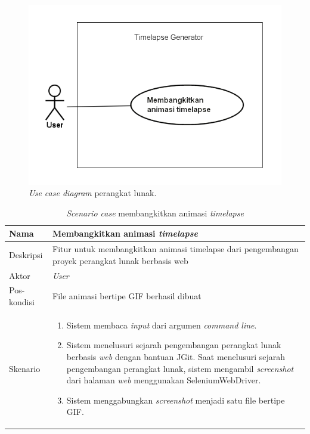 \begin{figure}[H]
	\centering
		\includegraphics[scale=0.8]{Gambar/UseCaseDiagram1.png}
	\caption{\textit{Use case diagram} perangkat lunak.}
	\label{fig:uc}
\end{figure}

\begin{table}[H]
    \centering
    \begin{tabular}{|p{3cm}|p{10cm}|}
    \hline
        Nama & Membangkitkan animasi \textit{timelapse}\\
    \hline
    \hline
        Deskripsi & Fitur untuk membangkitkan animasi timelapse dari pengembangan proyek perangkat lunak berbasis web\\
    \hline
        Aktor & \textit{User} \\
    \hline
        Pos-kondisi &  File animasi bertipe GIF berhasil dibuat\\
    \hline
        Skenario & 
        \begin{enumerate}
        \item Sistem membaca \textit{input} dari argumen \textit{command line}.
            \item Sistem menelusuri sejarah pengembangan perangkat lunak berbasis \textit{web} dengan bantuan
JGit. Saat menelusuri sejarah pengembangan perangkat lunak, sistem mengambil \textit{screenshot} dari halaman \textit{web} menggunakan SeleniumWebDriver.
            \item Sistem menggabungkan \textit{screenshot} menjadi satu file bertipe GIF.
        \end{enumerate}\\
    \hline
    \end{tabular}
    \caption{\textit{Scenario case} membangkitkan animasi \textit{timelapse}}
    \label{tab:tabel_sc_animasi}
\end{table}

